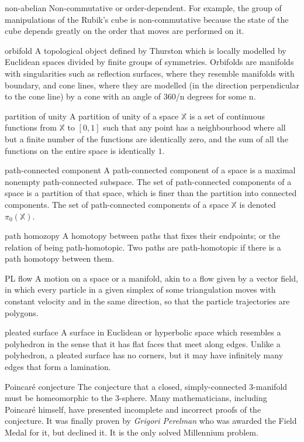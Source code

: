\begin{description}
\begin{tiny}
\item[non-abelian] Non-commutative or order-dependent. For example, the group of manipulations of the Rubik's cube is non-commutative because the state of the cube depends greatly on the order that moves are performed on it.
\item[orbifold] A topological object defined by Thurston which is locally modelled by Euclidean spaces divided by finite groups of symmetries. Orbifolds are manifolds with singularities such as reflection surfaces, where they resemble manifolds with boundary, and cone lines, where they are modelled (in the direction perpendicular to the cone line) by a cone with an angle of 360/n degrees for some n.
\item[partition of unity] A partition of unity of a space $\mathbb{X}$ is a set of continuous functions from $\mathbb{X}$ to $[0, 1]$ such that any point has a neighbourhood where all but a finite number of the functions are identically zero, and the sum of all the functions on the entire space is identically $1$.
\item[path-connected component] A path-connected component of a space is a maximal nonempty path-connected subspace. The set of path-connected components of a space is a partition of that space, which is finer than the partition into connected components. The set of path-connected components of a space $\mathbb{X}$ is denoted $\pi_{0}(\mathbb{X})$.
\item[path homozopy] A homotopy between paths that fixes their endpoints; or the relation of being path-homotopic. Two paths are path-homotopic if there is a path homotopy between them.
\item[PL flow] A motion on a space or a manifold, akin to a flow given by a vector field, in which every particle in a given simplex of some triangulation moves with constant velocity and in the same direction, so that the particle trajectories are polygons.
\item[pleated surface] A surface in Euclidean or hyperbolic space which resembles a polyhedron in the sense that it has flat faces that meet along edges. Unlike a polyhedron, a pleated surface has no corners, but it may have infinitely many edges that form a lamination.
\item[Poincaré conjecture] The conjecture that a closed, simply-connected 3-manifold must be homeomorphic to the 3-sphere. Many mathematicians, including Poincaré himself, have presented incomplete and incorrect proofs of the conjecture. It was finally proven by \textit{Grigori Perelman} who was awarded the Field Medal for it, but declined it. It is the only solved Millennium problem.

\end{tiny}
\end{description}
